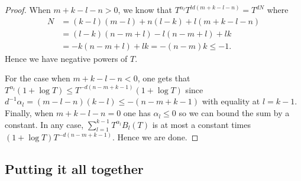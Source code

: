 \documentclass{amsart}
\theoremstyle{definition}
\theoremstyle{remark}
\begin{document}
\begin{proof}
When $m+k-l-n > 0$, we know that $T^{\alpha_{l}} T^{ld(m+k-l-n)} = T^{d N }$ 
    where
    \begin{align}
        N  & =  (k-l)(m-l)  + n(l-k) + l(m+k-l-n)  \\
           & =    (l-k)(n-m+l) -l(n-m+l) +lk   \\
           & =    -k(n-m+l)  +lk   = -(n-m)k  \leq -1.
    \end{align}
    Hence we have negative powers of $T$. 

    For the case when $m+k-l-n < 0$, 
    one gets that $T^{\alpha_{l}} (1 + \log T) \leq T^{-d(n-m+k-1)} (1 + \log T)$ 
    since $d^{-1}\alpha_{l} = (m-l-n)(k-l) \leq - (n-m+k-1)$ with equality at $l=k-1$.
    Finally, when $m+k-l-n = 0$ one has $\alpha_{l}\leq 0$ so we can bound the sum by a constant. In any case, $\sum_{l=1}^{k-1} T^{\alpha_{l}} B_{l}(T)$ is at most a constant times $(1 + \log T)T^{-d(n-m+k-1)}$. Hence we are done.
\end{proof}

\subsection{Putting it all together}
\label{ss:proof_of_main}
\end{document}
